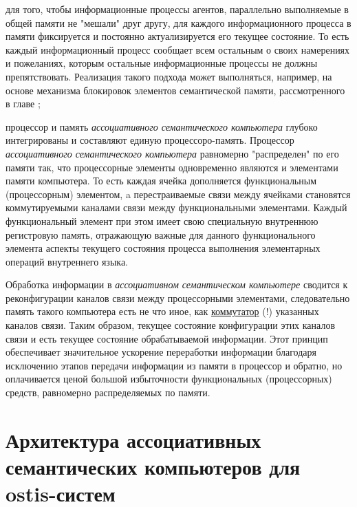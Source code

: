 \begin{textitemize}
	\item для того, чтобы информационные процессы агентов, параллельно выполняемые в общей памяти не "мешали"{} друг другу, для каждого информационного процесса в памяти фиксируется и постоянно актуализируется его текущее состояние. То есть каждый информационный процесс сообщает всем остальным о своих намерениях и пожеланиях, которым остальные информационные процессы не должны препятствовать. Реализация такого подхода может выполняться, например, на основе механизма блокировок элементов семантической памяти, рассмотренного в главе ;
	\item процессор и память \textit{ассоциативного семантического компьютера} глубоко интегрированы и составляют единую процессоро-память. Процессор \textit{ассоциативного семантического компьютера} равномерно "распределен"{} по его памяти так, что процессорные элементы одновременно являются и элементами памяти компьютера. То есть каждая ячейка дополняется функциональным (процессорным) элементом, a перестраиваемые связи между ячейками становятся коммутируемыми каналами связи между функциональными элементами. Каждый функциональный элемент при этом имеет свою специальную внутреннюю регистровую память, отражающую важные для данного функционального элемента аспекты текущего состояния процесса выполнения элементарных операций внутреннего языка.
	
	Обработка информации в \textit{ассоциативном семантическом компьютере} сводится к реконфигурации каналов связи между процессорными элементами,  следовательно память такого компьютера есть не что иное, как \uline{коммутатор} (!) указанных каналов связи. Таким образом, текущее состояние конфигурации этих каналов связи и есть текущее состояние обрабатываемой информации. Этот принцип обеспечивает значительное ускорение переработки информации благодаря исключению этапов передачи информации из памяти в процессор и обратно, но оплачивается ценой большой избыточности функциональных (процессорных) средств, равномерно распределяемых по памяти.
\end{textitemize}

\section{Архитектура ассоциативных семантических компьютеров для ostis-систем}

